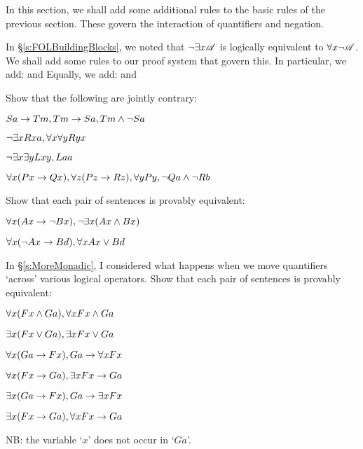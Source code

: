 In this section, we shall add some additional rules to the basic rules of the previous section. These govern the interaction of quantifiers and negation.
 
In \S\ref{s:FOLBuildingBlocks}, we noted that $\neg\exists x\mathscr{A}$ is logically equivalent to $\forall x \neg\mathscr{A}$. We shall add some rules to our proof system that govern this. In particular, we add:
and
Equally, we add:
and

\practiceproblems

\problempart
Show that the following are jointly contrary:
\begin{earg}
\item $Sa\rightarrow Tm, Tm \rightarrow Sa, Tm \wedge \neg Sa$
\item $\neg\exists x Rxa, \forall x \forall y Ryx$
\item $\neg\exists x \exists y Lxy, Laa$
\item $\forall x(Px \rightarrow Qx), \forall z(Pz \rightarrow Rz), \forall y Py, \neg Qa \wedge \neg Rb$
\end{earg}

\problempart
Show that each pair of sentences is provably equivalent:
\begin{earg}
\item $\forall x (Ax\rightarrow \neg Bx), \neg\exists x(Ax \wedge Bx)$
\item $\forall x (\neg Ax\rightarrow Bd), \forall x Ax \vee Bd$
\end{earg}

\problempart
In \S\ref{s:MoreMonadic}, I considered what happens when we move quantifiers `across' various logical operators. Show that each pair of sentences is provably equivalent:
\begin{earg}
\item $\forall x (Fx \wedge Ga), \forall x Fx \wedge Ga$
\item $\exists x (Fx \vee Ga), \exists x Fx \vee Ga$
\item $\forall x(Ga \rightarrow Fx), Ga \rightarrow \forall x Fx$
\item $\forall x(Fx \rightarrow Ga), \exists x Fx \rightarrow Ga$
\item $\exists x(Ga \rightarrow Fx), Ga \rightarrow \exists x Fx$
\item $\exists x(Fx \rightarrow Ga), \forall x Fx \rightarrow Ga$
\end{earg}
NB: the variable `$x$' does not occur in `$Ga$'.

